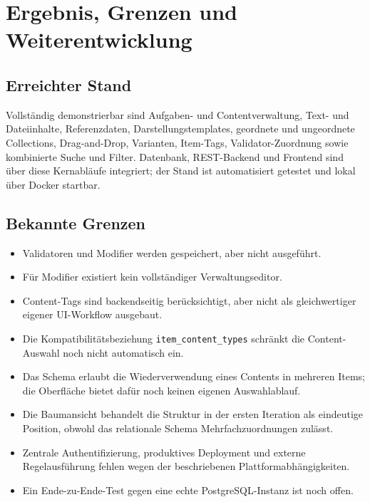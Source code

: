 \documentclass[11pt,a4paper]{article}
\begin{document}
\section{Ergebnis, Grenzen und Weiterentwicklung}
\subsection{Erreichter Stand}
Vollständig demonstrierbar sind Aufgaben- und Contentverwaltung, Text- und
Dateiinhalte, Referenzdaten, Darstellungstemplates, geordnete und ungeordnete
Collections, Drag-and-Drop, Varianten, Item-Tags, Validator-Zuordnung sowie
kombinierte Suche und Filter. Datenbank, REST-Backend und Frontend sind über
diese Kernabläufe integriert; der Stand ist automatisiert getestet und lokal
über Docker startbar.

\subsection{Bekannte Grenzen}
\begin{itemize}
\item Validatoren und Modifier werden gespeichert, aber nicht ausgeführt.
\item Für Modifier existiert kein vollständiger Verwaltungseditor.
\item Content-Tags sind backendseitig berücksichtigt, aber nicht als
gleichwertiger eigener UI-Workflow ausgebaut.
\item Die Kompatibilitätsbeziehung \texttt{item\_content\_types} schränkt die
Content-Auswahl noch nicht automatisch ein.
\item Das Schema erlaubt die Wiederverwendung eines Contents in mehreren
Items; die Oberfläche bietet dafür noch keinen eigenen Auswahlablauf.
\item Die Baumansicht behandelt die Struktur in der ersten Iteration als
eindeutige Position, obwohl das relationale Schema Mehrfachzuordnungen
zulässt.
\item Zentrale Authentifizierung, produktives Deployment und externe
Regelausführung fehlen wegen der beschriebenen Plattformabhängigkeiten.
\item Ein Ende-zu-Ende-Test gegen eine echte PostgreSQL-Instanz ist noch offen.
\end{itemize}
\end{document}
